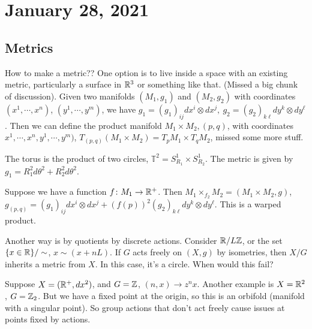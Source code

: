 \section{January 28, 2021}
\subsection{Metrics}
How to make a metric?? One option is to live inside a space with an existing metric, particularly a surface in $\mathbb{R}^3$ or something like that. (Missed a big chunk of discussion). Given two manifolds $(M_1,g_1)$ and $(M_2,g_2)$ with coordinates $(x^1,\cdots ,x^n )$, $(y^1,\cdots ,y^m )$, we have $g_1=(g_1)_{ij}dx^i \otimes dx^j , \ g_2=(g_2)_{k\ell}dy^{k}\otimes dy^{\ell}$. Then we can define the product manifold $M_1 \times  M_2, (p,q)$, with coordinates $x^1,\cdots ,x^n , y^1,\cdots ,y^m)$, $T_{(p,q)}(M_1\times M_2)=T_pM_1 \times T_q M_2$, missed some more stuff.
\begin{example}
    The torus is the product of two circles, $\mathbb{T}^2=S^1 _{R_1}\times S^1 _{R_2}$. The metric is given by $g_1=R_1^2d\theta^2+ R_2^2 d\theta ^2$.
\end{example}

\begin{definition}[]
    Suppose we have a function $f \colon M_1 \to \mathbb{R}^+$. Then $M_1 \times _{f_2}M_2=(M_1 \times  M_2,g)$, $g_{(p,q)}=(g_1)_{ij}dx^i  \otimes dx^j +(f(p))^2 (g_2)_{k\ell}dy^k\otimes dy^{\ell}$. This is a warped product.
\end{definition}
Another way is by quotients by discrete actions. Consider $\mathbb{R} / L\mathbb{Z}$, or the set $\{x\in \mathbb{R}\} / \sim$, $x \sim (x+nL)$. If $G$ acts freely on $(X,g)$ by isometries, then $X /G$ inherits a metric from $X$. In this case, it's a circle. When would this fail?
\begin{example}
    Suppose $X=(\mathbb{R}^+, dx^2)$, and $G=\mathbb{Z}$, $(n,x) \to  z^n x$. Another example is $X=\mathbb{R}^2$, $G=\mathbb{Z}_2$. But we have a fixed point at the origin, so this is an orbifold (manifold with a singular point). So group actions that don't act freely cause issues at points fixed by actions.
\end{example}
